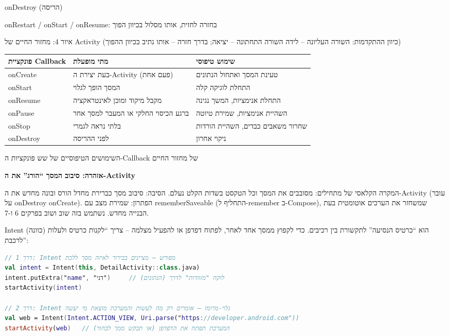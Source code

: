 onDestroy (הריסה)

onRestart / onStart / onResume: בחזרה לחזית, אותו מסלול בכיוון הפוך

\begin{center}\small\color{gray}איור 4: מחזור החיים של Activity (כיוון ההתקדמות: השורה העליונה – לידה השורה התחתונה – יציאה; בדרך חזרה – אותו נתיב בכיוון ההפוך)\end{center}

\begin{center}
\begin{tabularx}{\linewidth}{|X|X|X|}
\hline
\textbf{פונקציית Callback} & \textbf{מתי מופעלת} & \textbf{שימוש טיפוסי} \tabularnewline
\hline
onCreate & בעת יצירת ה-Activity (פעם אחת) & טעינת המסך ואתחול הנתונים \tabularnewline
onStart & המסך הופך לגלוי & התחלת לוגיקה קלה \tabularnewline
onResume & מקבל מיקוד ומוכן לאינטראקציה & התחלת אנימציות, המשך נגינה \tabularnewline
onPause & ברגע הכיסוי החלקי או המעבר למסך אחר & השהיית אנימציות, שמירת טיוטה \tabularnewline
onStop & בלתי נראה לגמרי & שחרור משאבים כבדים, השהיית הורדות \tabularnewline
onDestroy & לפני ההריסה & ניקוי אחרון \tabularnewline
\hline
\end{tabularx}
\end{center}

\begin{center}\small\color{gray}השימושים הטיפוסיים של שש פונקציות ה-Callback של מחזור החיים\end{center}

\textbf{אזהרה: סיבוב המסך “הורג” את ה-Activity}\par

המקרה הקלאסי של מתחילים: מסובבים את המסך וכל הטקסט בשדות הקלט נעלם. הסיבה: סיבוב מסך כברירת מחדל הורס ובונה מחדש את ה-Activity (עובר על onDestroy onCreate). הפתרון: שמירת מצב עם rememberSaveable (התחליף ל-remember ב-Compose), שמשחזר את הערכים אוטומטית בעת הבנייה מחדש. נשתמש בזה שוב ושוב בפרקים 6 ו-7.


‏Intent (כוונה) הוא “כרטיס הנסיעה” לתקשורת בין רכיבים. כדי לקפוץ ממסך אחד לאחר, לפתוח דפדפן או להפעיל מצלמה – צריך “לקנות כרטיס ולעלות לרכבת”:

\begin{lstlisting}[language=Kotlin]
// דרך 1: Intent מפורש – מציינים בבירור לאיזה מסך ללכת
val intent = Intent(this, DetailActivity::class.java)
intent.putExtra("name", "דני")     // לוקח "מזוודות" לדרך (הנתונים)
startActivity(intent)

// דרך 2: Intent גלוי-מרומז – אומרים רק מה לעשות והמערכת מוצאת מי יעשה
val web = Intent(Intent.ACTION_VIEW, Uri.parse("https://developer.android.com"))
startActivity(web)   // המערכת תפתח את הדפדפן (או תבקש ממך לבחור)
\end{lstlisting}

